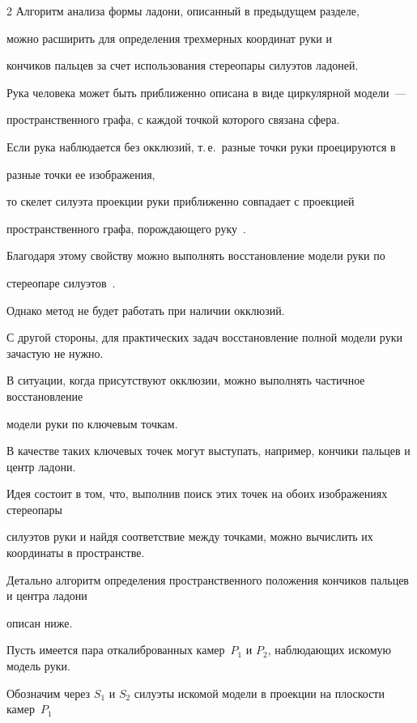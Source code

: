 \begin{multicols}{2}
Алгоритм анализа формы ладони, описанный в предыдущем разделе,


можно расширить для определения трехмерных координат руки и 


кончиков пальцев за счет использования стереопары силуэтов ладоней.





Рука человека может быть приближенно описана в виде циркулярной модели~--- 


пространственного графа, с каждой точкой которого связана сфера.


Если рука наблюдается без окклюзий, т.\,е.\ разные точки руки проецируются в 


разные точки ее изображения,


то скелет силуэта проекции руки приближенно совпадает с проекцией 


пространственного графа, порождающего руку~\cite{GeneralizedCylinders1995}.


Благодаря этому свойству можно выполнять восстановление модели руки по 


стереопаре силуэтов~\cite{Tsiskaridze2009, Tsiskaridze2010}.


Однако метод не будет работать при наличии окклюзий.





С другой стороны, для практических задач восстановление полной модели руки зачастую не нужно.


В ситуации, когда присутствуют окклюзии, можно выполнять частичное восстановление 


модели руки по ключевым точкам.


В качестве таких ключевых точек могут выступать, например, кончики пальцев и центр ладони.


Идея состоит в том, что, выполнив поиск этих точек на обоих изображениях стереопары 


силуэтов руки и найдя соответствие между точками, можно вычислить их координаты в пространстве.


Детально алгоритм определения пространственного положения кончиков пальцев и центра ладони 


описан ниже.





Пусть имеется пара откалиброванных камер~$P_1$ и $P_2$, наблюдающих искомую модель руки.


Обозначим через $S_1$ и $S_2$ силуэты искомой модели в проекции на плоскости камер~$P_1$ 



\end{multicols}
